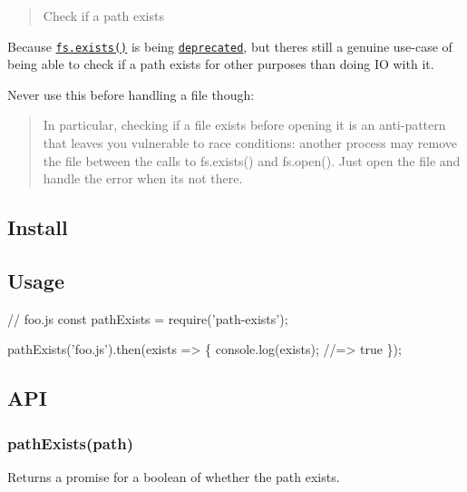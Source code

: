 \begin{quote}
Check if a path exists \end{quote}


Because \href{https://nodejs.org/api/fs.html#fs_fs_exists_path_callback}{\tt {\ttfamily fs.\+exists()}} is being \href{https://github.com/iojs/io.js/issues/103}{\tt deprecated}, but there\textquotesingle{}s still a genuine use-\/case of being able to check if a path exists for other purposes than doing IO with it.

Never use this before handling a file though\+:

\begin{quote}
In particular, checking if a file exists before opening it is an anti-\/pattern that leaves you vulnerable to race conditions\+: another process may remove the file between the calls to {\ttfamily fs.\+exists()} and {\ttfamily fs.\+open()}. Just open the file and handle the error when it\textquotesingle{}s not there. \end{quote}


\subsection*{Install}




\subsection*{Usage}


\begin{DoxyCode}
// foo.js
const pathExists = require('path-exists');

pathExists('foo.js').then(exists => \{
    console.log(exists);
    //=> true
\});
\end{DoxyCode}


\subsection*{A\+PI}

\subsubsection*{path\+Exists(path)}

Returns a promise for a boolean of whether the path exists.

